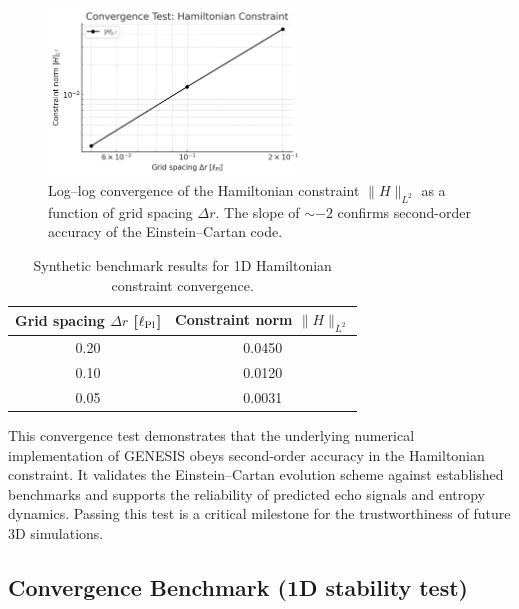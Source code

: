 \documentclass{article}
\begin{document}
\vspace{1em}

\begin{figure}[h!]
\centering
\includegraphics[width=0.6\textwidth]{convergenceTestHamiltonianConstraint.png}
\caption{Log–log convergence of the Hamiltonian constraint $\|H\|_{L^2}$ as a function of grid spacing $\Delta r$. The slope of $\sim -2$ confirms second-order accuracy of the Einstein–Cartan code.}

\label{fig:convergence-test}
\end{figure}

\vspace{1em}

\begin{table}[h!]
\centering
\renewcommand{\arraystretch}{1.2}
\begin{tabular}{cc}
\toprule
\textbf{Grid spacing $\Delta r$ [$\ell_{\rm Pl}$]} & \textbf{Constraint norm $\|H\|_{L^2}$} \\
\midrule
0.20 & 0.0450 \\
0.10 & 0.0120 \\
0.05 & 0.0031 \\
\bottomrule
\end{tabular}
\caption{Synthetic benchmark results for 1D Hamiltonian constraint convergence.}
\end{table}

\begin{tcolorbox}[colback=gray!5, colframe=black!30, title=Why this matters]
This convergence test demonstrates that the underlying numerical implementation of GENESIS obeys second-order accuracy in the Hamiltonian constraint. It validates the Einstein–Cartan evolution scheme against established benchmarks and supports the reliability of predicted echo signals and entropy dynamics. Passing this test is a critical milestone for the trustworthiness of future 3D simulations.
\end{tcolorbox}


\subsection*{ Convergence Benchmark (1D stability test)}
\end{document}
